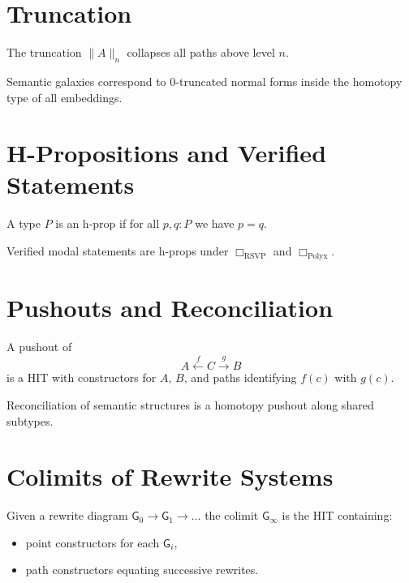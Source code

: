 \section{Truncation}

\begin{definition}[n-Truncation]
The truncation $\lVert A\rVert_n$ collapses all paths above level $n$.
\end{definition}

\begin{proposition}
Semantic galaxies correspond to $0$-truncated normal forms inside the homotopy type of all embeddings.
\end{proposition}

\section{H-Propositions and Verified Statements}

\begin{definition}[H-Prop]
A type $P$ is an h-prop if for all $p,q:P$ we have $p=q$.
\end{definition}

\begin{proposition}
Verified modal statements are h-props under $\Box_{\mathrm{RSVP}}$ and $\Box_{\mathrm{Polyx}}$.
\end{proposition}

\section{Pushouts and Reconciliation}

\begin{definition}
A pushout of
\[
A \xleftarrow{f} C \xrightarrow{g} B
\]
is a HIT with constructors for $A$, $B$, and paths identifying $f(c)$ with $g(c)$.
\end{definition}

\begin{proposition}
Reconciliation of semantic structures is a homotopy pushout along shared subtypes.
\end{proposition}

\section{Colimits of Rewrite Systems}

\begin{definition}
Given a rewrite diagram $\mathsf{G}_0 \to \mathsf{G}_1 \to \ldots$ the colimit $\mathsf{G}_\infty$ is the HIT containing:
\begin{itemize}
\item point constructors for each $\mathsf{G}_i$,
\item path constructors equating successive rewrites.
\end{itemize}
\end{definition}

